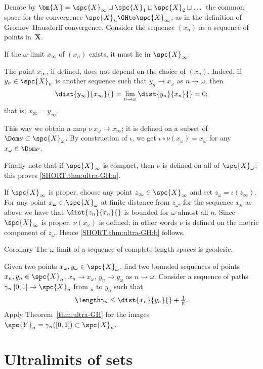 Denote by $\bm{X}=\spc{X}_\infty\sqcup\spc{X}_1\sqcup\spc{X}_2\sqcup\dots$ the common space for the convergence $\spc{X}_n\GHto \spc{X}_\infty$;
as in the definition of Gromov--Hausdorff convergence.
Consider the sequence $(x_n)$ 
as a sequence of points in~$\bm{X}$.

If the $\omega$-limit $x_\infty$ of $(x_n)$ exists, 
it must lie in $\spc{X}_\infty$. 

The point $x_\infty$, if defined, does not depend on the choice of $(x_n)$.
Indeed, if $y_n\in\spc{X}_n$ is another sequence such that $y_n\to x_\omega$ as $n\to\omega$, then 
\[
\dist{y_\infty}{x_\infty}{}=\lim_{n\to\omega}\dist{y_n}{x_n}{}=0;
\]
that is, $x_\infty=y_\infty$.


This way we obtain a map $\nu\:x_\omega\to x_\infty$;
it is defined on a subset of $\Dom\nu \subset\spc{X}_\omega$.
By construction of $\iota$, 
we get  $\iota\circ\nu(x_\omega)=x_\omega$ for any $x_\omega\in \Dom\nu$.

Finally note that if $\spc{X}_\infty$ is compact, then $\nu$ is defined on all of $\spc{X}_\omega$;
this proves \ref{SHORT.thm:ultra-GH:a}.

If $\spc{X}_\infty$ is proper, choose any point $z_\infty\in \spc{X}_\infty$
and set $z_\omega=\iota(z_\infty)$.
For any point $x_\omega\in \spc{X}_\omega$ at finite distance from $z_\omega$,
for the sequence $x_n$ 
as above we have that $\dist{z_n}{x_n}{}$ is bounded for $\omega$-almost all $n$.
Since $\spc{X}_\infty$ is proper, $\nu(x_\omega)$ is defined;
in other words $\nu$ is defined on the metric component of $z_\omega$.
Hence \ref{SHORT.thm:ultra-GH:b} follows.
\qeds

\begin{thm}{Corollary} 
\label{cor:ulara-geod}
The $\omega$-limit of a sequence of complete length spaces is geodesic.
\end{thm}

 Given two points $x_\omega,y_\omega\in \spc{X}_\omega$, find two bounded sequences of points $x_n,y_n\in \spc{X}_n$, $x_n\to x_\omega$, $y_n\to y_\omega$ as $n\to\omega$.
Consider a sequence of paths  $\gamma_n\:[0,1]\to \spc{X}_n$ from $_n$ to $y_n$
 such that 
\[\length\gamma_n\le \dist{x_n}{y_n}{}+\tfrac{1}{n}.\]
Apply Theorem~\ref{thm:ultra-GH} 
for the images $\spc{Y}_n=\gamma_n([0,1])\subset \spc{X}_n$.
\qeds

\section{Ultralimits of sets}

